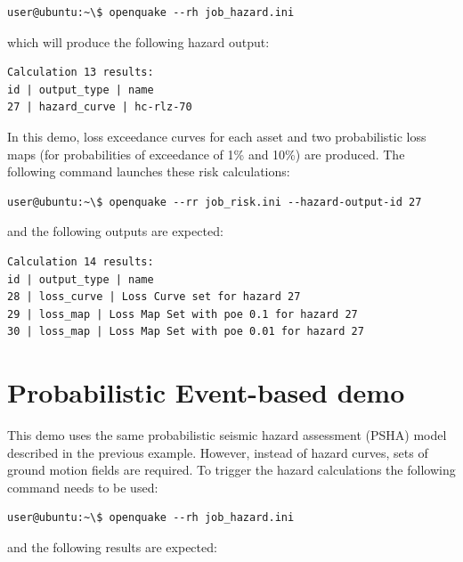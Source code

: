 \begin{Verbatim}[frame=single, commandchars=\\\{\}, samepage=true]
user@ubuntu:~\$ openquake --rh job_hazard.ini
\end{Verbatim}

which will produce the following hazard output:

\begin{Verbatim}[frame=single, commandchars=\\\{\}, samepage=true]
Calculation 13 results:
id | output_type | name
27 | hazard_curve | hc-rlz-70
\end{Verbatim}

In this demo, loss exceedance curves for each asset and two probabilistic loss maps (for probabilities of exceedance of 1\% and 10\%) are produced. The following command launches these risk calculations:

\begin{Verbatim}[frame=single, commandchars=\\\{\}, samepage=true]
user@ubuntu:~\$ openquake --rr job_risk.ini --hazard-output-id 27
\end{Verbatim}

and the following outputs are expected:

\begin{Verbatim}[frame=single, commandchars=\\\{\}, samepage=true]
Calculation 14 results:
id | output_type | name
28 | loss_curve | Loss Curve set for hazard 27
29 | loss_map | Loss Map Set with poe 0.1 for hazard 27
30 | loss_map | Loss Map Set with poe 0.01 for hazard 27
\end{Verbatim}

\section{Probabilistic Event-based demo}
This demo uses the same probabilistic seismic hazard assessment (PSHA) model described in the previous example. However, instead of hazard curves, sets of ground motion fields are required. To trigger the hazard calculations the following command needs to be used:

\begin{Verbatim}[frame=single, commandchars=\\\{\}, samepage=true]
user@ubuntu:~\$ openquake --rh job_hazard.ini
\end{Verbatim}

and the following results are expected:

